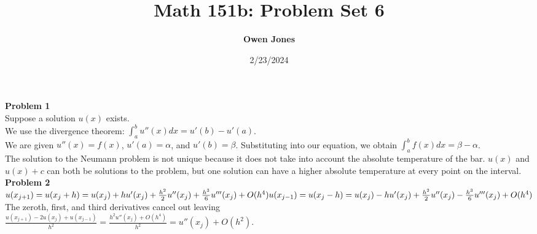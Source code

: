 \documentclass[10pt]{article}
\title{\bf Math 151b: Problem Set 6}
\date{2/23/2024}
\author{\bf Owen Jones}
\begin{document}
\maketitle

\noindent\textbf{Problem 1}\\
Suppose a solution $u(x)$ exists.\\
We use the  divergence theorem:
$\displaystyle \int_{a}^{b}u''(x)dx=u'(b)-u'(a)$.\\
We are given $u''(x)=f(x)$, $u'(a)=\alpha$, and $u'(b)=\beta$.
Substituting into our equation, we obtain $\displaystyle \int_{a}^{b}f(x)dx=\beta-\alpha$.\\
The solution to the Neumann problem is not unique because it does not take into account the absolute temperature of the bar. 
$u(x)$ and $u(x)+c$ can both be solutions to the problem, but one solution can have a higher absolute temperature at every point on the interval.\\
\textbf{Problem 2}\\
$u(x_{j+1})=u(x_j+h)=u(x_j)+hu'(x_j)+\frac{h^2}{2}u''(x_j)+\frac{h^3}{6}u'''(x_j)+O(h^4)\\
u(x_{j-1})=u(x_j-h)=u(x_j)-hu'(x_j)+\frac{h^2}{2}u''(x_j)-\frac{h^3}{6}u'''(x_j)+O(h^4)$\\
The zeroth, first, and third derivatives cancel out leaving\\
$\frac{u(x_{j+1})-2u(x_j)+u(x_{j-1})}{h^2}=\frac{h^2u''(x_j)+O(h^4)}{h^2}=u''(x_j)+O(h^2)$.\\
\end{document}

